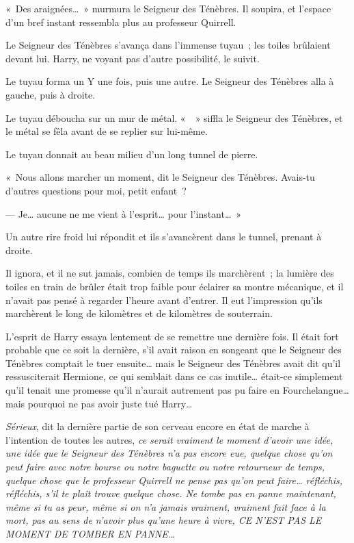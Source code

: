 «~Des araignées…~»
murmura le Seigneur des Ténèbres.
Il soupira, et l'espace d'un bref instant ressembla plus au professeur Quirrell.

Le Seigneur des Ténèbres s'avança dans l'immense tuyau~; les toiles brûlaient devant lui.
Harry, ne voyant pas d'autre possibilité, le suivit.

Le tuyau forma un Y une fois, puis une autre.
Le Seigneur des Ténèbres alla à gauche, puis à droite.

Le tuyau déboucha sur un mur de métal.
«~~» siffla le Seigneur des Ténèbres, et le métal se fêla avant de se replier sur lui-même.

Le tuyau donnait au beau milieu d'un long tunnel de pierre.

«~Nous allons marcher un moment, dit le Seigneur des Ténèbres.
Avais-tu d'autres questions pour moi, petit enfant~?

--- Je… aucune ne me vient à l'esprit… pour l'instant…~»

Un autre rire froid lui répondit et ils s'avancèrent dans le tunnel, prenant à droite.

Il ignora, et il ne sut jamais, combien de temps ils marchèrent~; la lumière des toiles en train de brûler était trop faible pour éclairer sa montre mécanique, et il n'avait pas pensé à regarder l'heure avant d'entrer.
Il eut l'impression qu'ils marchèrent le long de kilomètres et de kilomètres de souterrain.

L'esprit de Harry essaya lentement de se remettre une dernière fois.
Il était fort probable que ce soit la dernière, s'il avait raison en songeant que le Seigneur des Ténèbres comptait le tuer ensuite… mais le Seigneur des Ténèbres avait dit qu'il ressusciterait Hermione, ce qui semblait dans ce cas inutile… était-ce simplement qu'il tenait une promesse qu'il n'aurait autrement pas pu faire en Fourchelangue… mais pourquoi ne pas avoir juste tué Harry…

\emph{Sérieux}, dit la dernière partie de son cerveau encore en état de marche à l'intention de toutes les autres, \emph{ce serait vraiment le moment d'avoir une idée, une idée que le Seigneur des Ténèbres n'a pas encore eue, quelque chose qu'on peut faire avec notre bourse ou notre baguette ou notre retourneur de temps, quelque chose que le professeur Quirrell ne pense pas qu'on peut faire… réfléchis, réfléchis, s'il te plaît trouve quelque chose.
Ne tombe pas en panne maintenant, même si tu as peur, même si on n'a jamais vraiment, vraiment fait face à la mort, pas au sens de n'avoir plus qu'une heure à vivre, CE N'EST PAS LE MOMENT DE TOMBER EN PANNE…}

